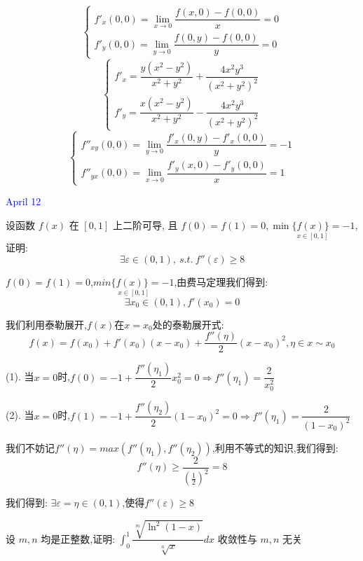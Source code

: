 \begin{solution}
	$$\left\lbrace
	\begin{array}{l}
		f'_{x}(0,0)=\lim\limits_{x\to 0}\dfrac{f(x,0)-f(0,0)}{x}=0\\
		f'_{y}(0,0)=\lim\limits_{y\to 0}\dfrac{f(0,y)-f(0,0)}{y}=0
	\end{array}
	\right. $$
	$$\left\lbrace 
	\begin{array}{l}
		f'_{x}=\dfrac{y(x^2-y^2)}{x^2+y^2}+\dfrac{4x^2y^3}{(x^2+y^2)^2}\\
		f'_{y}=\dfrac{x(x^2-y^2)}{x^2+y^2}-\dfrac{4x^2y^3}{(x^2+y^2)^2}
	\end{array}
	\right. $$
	$$\left\lbrace
	\begin{array}{l}
		f''_{xy}(0,0)=\lim\limits_{y\to 0}\dfrac{f'_{x}(0,y)-f'_{x}(0,0)}{y}=-1\\
		f''_{yx}(0,0)=\lim\limits_{x\to 0}\dfrac{f'_{y}(x,0)-f'_{y}(0,0)}{x}=1
	\end{array}
	\right. $$
\end{solution}


\textcolor{blue}{April 12}

\begin{example}[][Exam: 30.2.9]
	设函数 $f(x)$ 在 $[0,1]$ 上二阶可导, 且 $f(0)=f(1)=0,\underset{x\in [0,1]}{\min \{f(x)\}=-1}$, 证明: 
	$$\exists \varepsilon \in(0,1), \ s.t.\ f''(\varepsilon)\geq 8$$
\end{example}

\begin{solution}
	
	$f(0)=f(1)=0$,$\underset{x\in [0,1]}{min \{f(x)\}=-1}$,由费马定理我们得到: 
	$$\exists x_{0}\in(0,1),f'(x_{0})=0$$
	
	我们利用泰勒展开,$f(x)$在$x=x_{0}$处的泰勒展开式: 
	$$f(x)=f(x_{0})+f'(x_{0})(x-x_{0})+\frac{f''(\eta)}{2}(x-x_{0})^2,\eta \in x\sim x_{0} $$
	
	(1). 当$x=0$时,$f(0)=-1+\dfrac{f''(\eta_{1})}{2}x_{0}^2=0\Rightarrow f''(\eta_{1})=\dfrac{2}{x_{0}^2}$
	
	(2). 当$x=0$时,$f(1)=-1+\dfrac{f''(\eta_{2})}{2}(1-x_{0})^2=0\Rightarrow f''(\eta_{1})=\dfrac{2}{(1-x_{0})^2}$
	
	我们不妨记$f''(\eta)=max(f''(\eta_{1}),f''(\eta_{2}))$,利用不等式的知识,我们得到: 
	$$f''(\eta)\geq \frac{2}{(\frac{1}{2})^2}=8$$
	
	我们得到: $\exists \varepsilon=\eta \in(0,1)$,使得$f''(\varepsilon)\geq 8$
\end{solution}

\begin{example}[][Exam: 30.2.10]
	设 $m,n$ 均是正整数,证明: $\displaystyle{\int_{0}^{1}\dfrac{\sqrt[m]{\ln^{2}(1-x)}}{\sqrt[n]{x}}dx}$ 收敛性与 $m,n$ 无关
\end{example}

